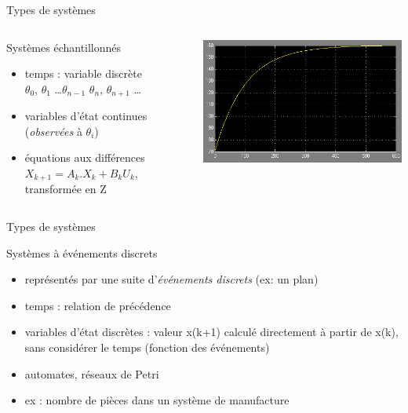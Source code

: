 \documentclass[compress]{beamer}
\begin{document}
\begin{frame}{Types de systèmes}
\begin{columns}
	\begin{block}{Systèmes échantillonnés}
	\begin{itemize}
	\item temps : variable discrète\\
		{\scriptsize $\theta_0$, $\theta_1$ \ldots $\theta_{n-1}$ $\theta_n$, $\theta_{n+1}$ \ldots}
	\item variables d'état continues ({\it observées} à $\theta_i$)%
	\item équations aux différences $X_{k+1}=A_k.X_k+B_kU_k$, transformée en Z
	\end{itemize}
	\end{block}
	\includegraphics[width=.9\linewidth]{xy_temp_s}
\end{columns}
\end{frame}

\begin{frame}{Types de systèmes}
\begin{block}{Systèmes à événements discrets}
	\begin{itemize}
	\item représentés par une suite d'{\it événements discrets} (ex: un plan)
	\item temps : relation de précédence
	\item variables d'état discrètes : valeur x(k+1) calculé directement à partir de x(k), sans 		considérer le temps (fonction des événements)
	\item automates, réseaux de Petri
	\item ex : nombre de pièces dans un système de manufacture
	\end{itemize}
\end{block}
\end{frame}
\end{document}
